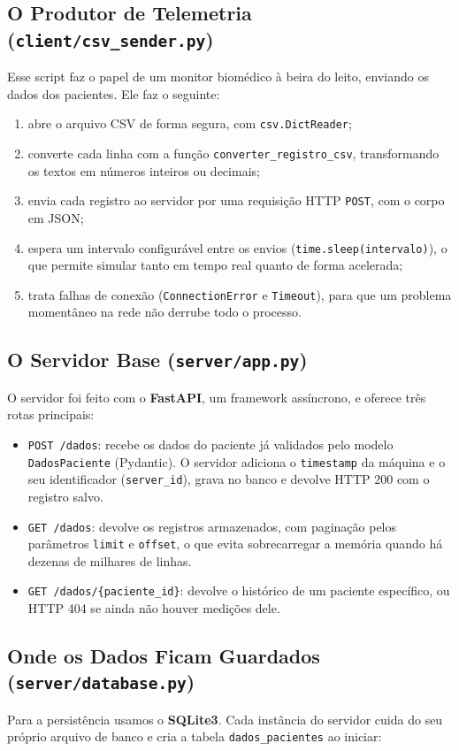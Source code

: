 \documentclass[12pt,a4paper]{article}
\begin{document}
	\subsection{O Produtor de Telemetria (\texttt{client/csv\_sender.py})}
	Esse script faz o papel de um monitor biomédico à beira do leito, enviando os dados dos pacientes. Ele faz o seguinte:
	\begin{enumerate}
		\item abre o arquivo CSV de forma segura, com \texttt{csv.DictReader};
		\item converte cada linha com a função \texttt{converter\_registro\_csv}, transformando os textos em números inteiros ou decimais;
		\item envia cada registro ao servidor por uma requisição HTTP \texttt{POST}, com o corpo em JSON;
		\item espera um intervalo configurável entre os envios (\texttt{time.sleep(intervalo)}), o que permite simular tanto em tempo real quanto de forma acelerada;
		\item trata falhas de conexão (\texttt{ConnectionError} e \texttt{Timeout}), para que um problema momentâneo na rede não derrube todo o processo.
	\end{enumerate}
	
	\subsection{O Servidor Base (\texttt{server/app.py})}
	O servidor foi feito com o \textbf{FastAPI}, um framework assíncrono, e oferece três rotas principais:
	\begin{itemize}
		\item \texttt{POST /dados}: recebe os dados do paciente já validados pelo modelo \texttt{DadosPaciente} (Pydantic). O servidor adiciona o \texttt{timestamp} da máquina e o seu identificador (\texttt{server\_id}), grava no banco e devolve HTTP 200 com o registro salvo.
		\item \texttt{GET /dados}: devolve os registros armazenados, com paginação pelos parâmetros \texttt{limit} e \texttt{offset}, o que evita sobrecarregar a memória quando há dezenas de milhares de linhas.
		\item \texttt{GET /dados/\{paciente\_id\}}: devolve o histórico de um paciente específico, ou HTTP 404 se ainda não houver medições dele.
	\end{itemize}
	
	\subsection{Onde os Dados Ficam Guardados (\texttt{server/database.py})}
	Para a persistência usamos o \textbf{SQLite3}. Cada instância do servidor cuida do seu próprio arquivo de banco e cria a tabela \texttt{dados\_pacientes} ao iniciar:
	
\end{document}
